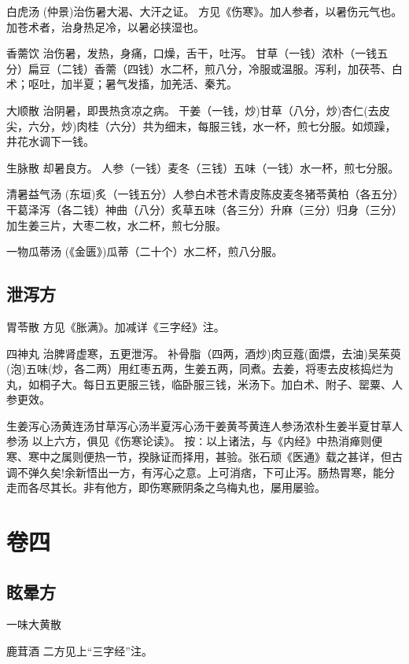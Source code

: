 \documentclass[a4paper,12pt,UTF8,twoside]{ctexbook}
\begin{document}
	白虎汤
	(仲景)治伤暑大渴、大汗之证。
	方见《伤寒》。加人参者，以暑伤元气也。加苍术者，治身热足冷，以暑必挟湿也。
	
	香薷饮
	治伤暑，发热，身痛，口燥，舌干，吐泻。
	甘草（一钱）浓朴（一钱五分）扁豆（二钱）香薷（四钱）水二杯，煎八分，冷服或温服。泻利，加茯苓、白术；呕吐，加半夏；暑气发搐，加羌活、秦艽。
	
	大顺散
	治阴暑，即畏热贪凉之病。
	干姜（一钱，炒)甘草（八分，炒)杏仁(去皮尖，六分，炒)肉桂（六分）共为细末，每服三钱，水一杯，煎七分服。如烦躁，井花水调下一钱。
	
	生脉散
	却暑良方。
	人参（一钱）麦冬（三钱）五味（一钱）水一杯，煎七分服。
	
	清暑益气汤
	(东垣)炙（一钱五分）人参白术苍术青皮陈皮麦冬猪苓黄柏（各五分）干葛泽泻（各二钱）神曲（八分）炙草五味（各三分）升麻（三分）归身（三分）加生姜三片，大枣二枚，水二杯，煎七分服。
	
	一物瓜蒂汤
	(《金匮》)瓜蒂（二十个）水二杯，煎八分服。
	
	
	
	\chapter{泄泻方}
	
	
	胃苓散
	方见《胀满》。加减详《三字经》注。
	
	四神丸
	治脾肾虚寒，五更泄泻。
	补骨脂（四两，酒炒)肉豆蔻(面煨，去油)吴茱萸(泡)五味(炒，各二两）用红枣五两，生姜五两，同煮。去姜，将枣去皮核捣烂为丸，如桐子大。每日五更服三钱，临卧服三钱，米汤下。加白术、附子、罂粟、人参更效。
	
	生姜泻心汤黄连汤甘草泻心汤半夏泻心汤干姜黄芩黄连人参汤浓朴生姜半夏甘草人参汤
	以上六方，俱见《伤寒论读》。
	按∶以上诸法，与《内经》中热消瘅则便寒、寒中之属则便热一节，揆脉证而择用，甚验。张石顽《医通》载之甚详，但古调不弹久矣!余新悟出一方，有泻心之意。上可消痞，下可止泻。肠热胃寒，能分走而各尽其长。非有他方，即伤寒厥阴条之乌梅丸也，屡用屡验。
	
	

	
	\part{卷四}
	\chapter{眩晕方}	
	
	一味大黄散
	
	鹿茸酒
	二方见上“三字经”注。
	
\end{document}
